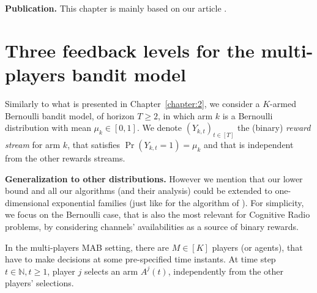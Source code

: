 \textbf{Publication.}
%
This chapter is mainly based on our article \cite{Besson2018ALT}.


\section{Three feedback levels for the multi-players bandit model}
\label{sec:5:model}

Similarly to what is presented in Chapter~\ref{chapter:2},
we consider a $K$-armed Bernoulli bandit model, %
of horizon $T \geq 2$,
in which arm $k$ is a Bernoulli distribution with mean $\mu_k\in[0,1]$.
We denote $(Y_{k,t})_{t\in[T]}$ the \iid{} (binary) \emph{reward stream} for arm $k$, that satisfies $\Pr(Y_{k,t}=1) = \mu_k$ and that is independent from the other rewards streams.

\textbf{Generalization to other distributions.}
However we mention that our lower bound and all our algorithms (and their analysis) could be extended to one-dimensional exponential families (just like for the \klUCB{} algorithm of \cite{KLUCBJournal}).
For simplicity, we focus on the Bernoulli case, that is also the most relevant for Cognitive Radio problems, by considering channels' availabilities as a source of binary rewards.





In the multi-players MAB setting, there are $M \in [K]$ players (or agents),
that have to make decisions at some pre-specified time instants.
At time step $t \in\mathbb{N},t\geq1$, player $j$ selects an arm $A^j(t)$, independently from the other players' selections.


